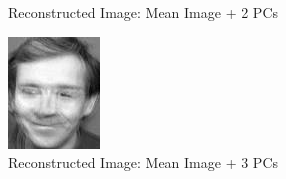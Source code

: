 \documentclass[12pt]{article}
\begin{document}
\begin{figure}
\begin{subfigure}[b]{0.20\textwidth}
		\caption{Reconstructed Image: Mean Image + 2 PCs}
	\end{subfigure}\quad
	\begin{subfigure}[b]{0.20\textwidth}
		\includegraphics[width=\textwidth]{Task4.3_Images/ReconstructedImage3.jpg}
		\caption{Reconstructed Image: Mean Image + 3 PCs}
	\end{subfigure}\\
	\begin{subfigure}[b]{0.20\textwidth}

\end{subfigure}
\end{figure}
\end{document}
